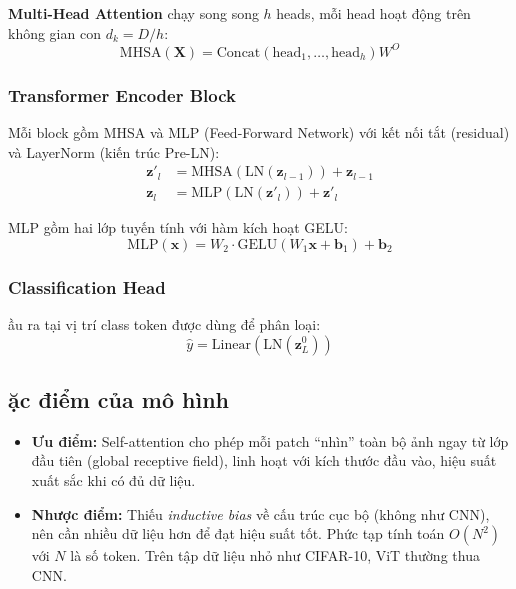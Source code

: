 \documentclass[a4paper]{article}
\theoremstyle{definition}
\begin{document}
\textbf{Multi-Head Attention} chạy song song $h$ heads, mỗi head hoạt động trên không gian con $d_k = D/h$:
\begin{equation}
	\text{MHSA}(\mathbf{X}) = \text{Concat}(\text{head}_1, \ldots, \text{head}_h) W^O
	\label{eq:mhsa}
\end{equation}

\subsubsection{Transformer Encoder Block}
Mỗi block gồm MHSA và MLP (Feed-Forward Network) với kết nối tắt (residual) và LayerNorm (kiến trúc Pre-LN):
\begin{align}
	\mathbf{z}'_l &= \text{MHSA}(\text{LN}(\mathbf{z}_{l-1})) + \mathbf{z}_{l-1} \label{eq:transformer-attn} \\
	\mathbf{z}_l  &= \text{MLP}(\text{LN}(\mathbf{z}'_l)) + \mathbf{z}'_l \label{eq:transformer-mlp}
\end{align}

MLP gồm hai lớp tuyến tính với hàm kích hoạt GELU:
\begin{equation}
	\text{MLP}(\mathbf{x}) = W_2 \cdot \text{GELU}(W_1 \mathbf{x} + \mathbf{b}_1) + \mathbf{b}_2
\end{equation}

\subsubsection{Classification Head}
\DJ ầu ra tại vị trí class token được dùng để phân loại:
\begin{equation}
	\hat{y} = \text{Linear}(\text{LN}(\mathbf{z}_L^0))
\end{equation}

\subsection{\DJ ặc điểm của mô hình}
\begin{itemize}
	\item \textbf{Ưu điểm:} Self-attention cho phép mỗi patch ``nhìn'' toàn bộ ảnh ngay từ lớp đầu tiên (global receptive field), linh hoạt với kích thước đầu vào, hiệu suất xuất sắc khi có đủ dữ liệu.
	\item \textbf{Nhược điểm:} Thiếu \textit{inductive bias} về cấu trúc cục bộ (không như CNN), nên cần nhiều dữ liệu hơn để đạt hiệu suất tốt. Phức tạp tính toán $O(N^2)$ với $N$ là số token. Trên tập dữ liệu nhỏ như CIFAR-10, ViT thường thua CNN.
\end{itemize}
\end{document}
